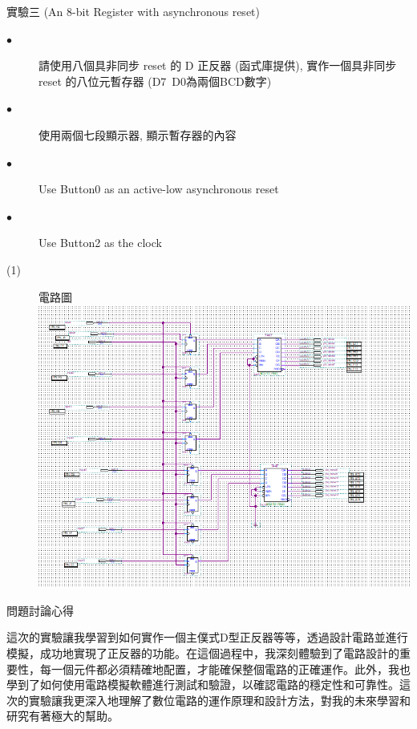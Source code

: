\documentclass[12pt, a4paper]{article}
\begin{document}
\begin{description}
\begin{description}
          \fontsize{20pt}{22pt}\selectfont
          \item 實驗三 (An 8-bit Register with asynchronous reset)
          \fontsize{16pt}{18pt}\selectfont
            \begin{description}
              \item [$\bullet$]請使用八個具非同步 reset 的 D 正反器 (函式庫提供), 實作一個具非同步 reset 的八位元暫存器 (D7~D0為兩個BCD數字)
              \item [$\bullet$]使用兩個七段顯示器, 顯示暫存器的內容
              \item [$\bullet$]Use Button0 as an active-low asynchronous reset
              \item [$\bullet$]Use Button2 as the clock\\
              \fontsize{18pt}{20pt}
                \item [(1)]電路圖 \\[.3cm]
                  \includegraphics[width=13cm]{./image/ex3.PNG}\\         
            \end{description}
          \normalsize

        \normalsize
      \end{description}
    \item [三、]問題討論心得 \\[.6cm]
      \begin{minipage}[t]{\linewidth}
        \fontsize{16}{18}\selectfont
          這次的實驗讓我學習到如何實作一個主僕式D型正反器等等，透過設計電路並進行模擬，成功地實現了正反器的功能。在這個過程中，我深刻體驗到了電路設計的重要性，每一個元件都必須精確地配置，才能確保整個電路的正確運作。此外，我也學到了如何使用電路模擬軟體進行測試和驗證，以確認電路的穩定性和可靠性。這次的實驗讓我更深入地理解了數位電路的運作原理和設計方法，對我的未來學習和研究有著極大的幫助。
        \normalsize  
      \end{minipage}
  \normalsize
\end{description}
\end{document}
